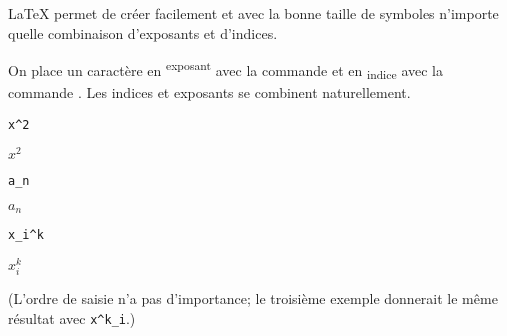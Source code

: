 {\LaTeX} permet de créer facilement et avec la bonne taille de
symboles n'importe quelle combinaison d'exposants et d'indices.

On place un caractère en \textsuperscript{exposant} avec la
commande \cmd{^} et en \textsubscript{indice} avec la commande
\cmd{_}. Les indices et exposants se combinent naturellement.
\begin{demo}
  \def\strut{\rule[-0.4ex]{0pt}{2ex}}
  \begin{minipage}{0.3\linewidth}
    \begin{texample}[0.6\linewidth]
\begin{lstlisting}
x^2
\end{lstlisting}
      \producing\strut $x^2$
    \end{texample}
  \end{minipage}
  \quad
  \begin{minipage}{0.3\linewidth}
    \begin{texample}[0.6\linewidth]
\begin{lstlisting}
a_n
\end{lstlisting}
      \producing\strut $a_n$
    \end{texample}
  \end{minipage}
  \quad
  \begin{minipage}{0.3\linewidth}
    \begin{texample}[0.63\linewidth]
\begin{lstlisting}
x_i^k
\end{lstlisting}
      \producing\strut $x_i^k$
    \end{texample}
  \end{minipage}
\end{demo}
(L'ordre de saisie n'a pas d'importance; le troisième exemple
donnerait le même résultat avec \verb=x^k_i=.)

